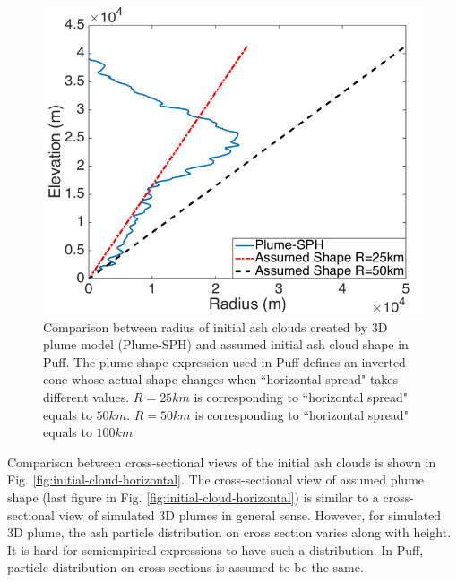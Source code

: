 \documentclass[draft,linenumbers]{agujournal2019}
\begin{document}
\begin{figure}[!htb]
\centering
\includegraphics[width=0.50 \textwidth]{Figures/radius-Plume-SPH-And-Assumed}
\caption{Comparison between radius of initial ash clouds created by 3D plume model (Plume-SPH) and assumed initial ash cloud shape in Puff. The plume shape expression used in Puff defines an inverted cone whose actual shape changes when ``horizontal spread" takes different values. $R=25km$ is corresponding to ``horizontal spread" equals to $50km$. $R=50km$ is corresponding to ``horizontal spread" equals to $100km$}
\label{fig:radius-comparison}
\end{figure}

Comparison between cross-sectional views of the initial ash clouds is shown in Fig. \ref{fig:initial-cloud-horizontal}. The cross-sectional view of assumed plume shape (last figure in Fig. \ref{fig:initial-cloud-horizontal}) is similar to a cross-sectional view of simulated 3D plumes in general sense. However, for simulated 3D plume, the ash particle distribution on cross section varies along with height. It is hard for semiempirical expressions to have such a distribution. In Puff, particle distribution on cross sections is assumed to be the same.
\end{document}
